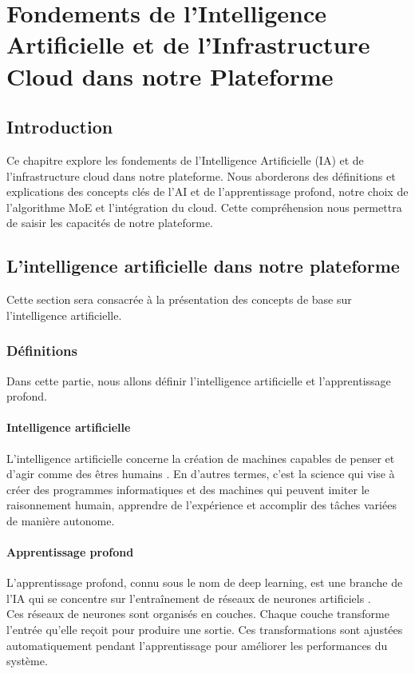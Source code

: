 \vfill 
\chapter{Fondements de l'Intelligence Artificielle et de l'Infrastructure Cloud dans notre Plateforme}
\label{chap:fondements de l'Intelligence Artificielle et de l'Infrastructure Cloud dans notre Plateforme}
\mtcaddchapter
\section*{Introduction}
\justifying
Ce chapitre explore les fondements de l'Intelligence Artificielle (IA) et de l'infrastructure cloud dans notre plateforme. Nous aborderons des définitions et explications des concepts clés de l’AI et de l’apprentissage profond, notre choix de l'algorithme MoE et l'intégration du cloud. Cette compréhension nous permettra de saisir les capacités de notre plateforme.

\section{L'intelligence artificielle dans notre plateforme}
\justifying
Cette section sera consacrée à la présentation des concepts de base sur 
l’intelligence artificielle.
\subsection{Définitions}
\justifying
Dans cette partie, nous allons définir l'intelligence artificielle et l'apprentissage profond.


\subsubsection{Intelligence artificielle}
\justifying
L'intelligence artificielle concerne la création de machines capables de penser et d'agir comme des êtres humains \cite{ai}. En d'autres termes, c'est la science qui vise à créer des programmes informatiques et des machines qui peuvent imiter le raisonnement humain, apprendre de l'expérience et accomplir des tâches variées de manière autonome.

\subsubsection{Apprentissage profond}
\justifying
L'apprentissage profond, connu sous le nom de deep learning, est une branche de l’IA qui se concentre sur l'entraînement de réseaux de neurones artificiels \cite{deepLearning}.\\
Ces réseaux de neurones sont organisés en couches. Chaque couche transforme l'entrée qu'elle reçoit pour produire une sortie. Ces transformations sont ajustées automatiquement pendant l'apprentissage pour améliorer les performances du système.

